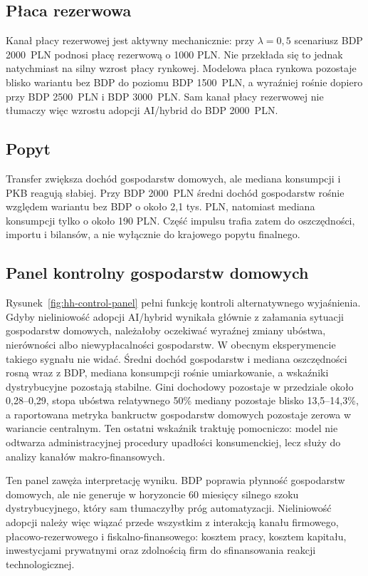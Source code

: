 \subsection{Płaca rezerwowa}

Kanał płacy rezerwowej jest aktywny mechanicznie: przy \(\lambda = 0{,}5\) scenariusz BDP 2000~PLN podnosi płacę rezerwową o 1000 PLN. Nie przekłada się to jednak natychmiast na silny wzrost płacy rynkowej. Modelowa płaca rynkowa pozostaje blisko wariantu bez BDP do poziomu BDP 1500~PLN, a wyraźniej rośnie dopiero przy BDP 2500~PLN i BDP 3000~PLN. Sam kanał płacy rezerwowej nie tłumaczy więc wzrostu adopcji AI/hybrid do BDP 2000~PLN.

\subsection{Popyt}

Transfer zwiększa dochód gospodarstw domowych, ale mediana konsumpcji i PKB reagują słabiej. Przy BDP 2000~PLN średni dochód gospodarstw rośnie względem wariantu bez BDP o około 2,1 tys. PLN, natomiast mediana konsumpcji tylko o około 190 PLN. Część impulsu trafia zatem do oszczędności, importu i bilansów, a nie wyłącznie do krajowego popytu finalnego.

\subsection{Panel kontrolny gospodarstw domowych}

Rysunek~\ref{fig:hh-control-panel} pełni funkcję kontroli alternatywnego wyjaśnienia. Gdyby nieliniowość adopcji AI/hybrid wynikała głównie z załamania sytuacji gospodarstw domowych, należałoby oczekiwać wyraźnej zmiany ubóstwa, nierówności albo niewypłacalności gospodarstw. W obecnym eksperymencie takiego sygnału nie widać. Średni dochód gospodarstw i mediana oszczędności rosną wraz z BDP, mediana konsumpcji rośnie umiarkowanie, a wskaźniki dystrybucyjne pozostają stabilne. Gini dochodowy pozostaje w przedziale około 0,28--0,29, stopa ubóstwa relatywnego 50\% mediany pozostaje blisko 13,5--14,3\%, a raportowana metryka bankructw gospodarstw domowych pozostaje zerowa w wariancie centralnym. Ten ostatni wskaźnik traktuję pomocniczo: model nie odtwarza administracyjnej procedury upadłości konsumenckiej, lecz służy do analizy kanałów makro-finansowych.

Ten panel zawęża interpretację wyniku. BDP poprawia płynność gospodarstw domowych, ale nie generuje w horyzoncie 60 miesięcy silnego szoku dystrybucyjnego, który sam tłumaczyłby próg automatyzacji. Nieliniowość adopcji należy więc wiązać przede wszystkim z interakcją kanału firmowego, płacowo-rezerwowego i fiskalno-finansowego: kosztem pracy, kosztem kapitału, inwestycjami prywatnymi oraz zdolnością firm do sfinansowania reakcji technologicznej.

